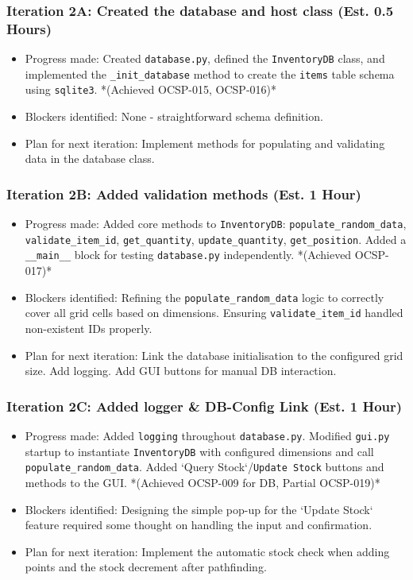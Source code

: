 \subsubsection{Iteration 2A: Created the database and host class (Est. 0.5 Hours)}
\begin{itemize}
	\item Progress made: Created \verb|database.py|, defined the \verb|InventoryDB| class, and implemented the \verb|_init_database| method to create the \verb|items| table schema using \verb|sqlite3|. *(Achieved OCSP-015, OCSP-016)*
	\item Blockers identified: None - straightforward schema definition.
	\item Plan for next iteration: Implement methods for populating and validating data in the database class.
\end{itemize}

\subsubsection{Iteration 2B: Added validation methods (Est. 1 Hour)}
\begin{itemize}
	\item Progress made: Added core methods to \verb|InventoryDB|: \verb|populate_random_data|, \verb|validate_item_id|, \verb|get_quantity|, \verb|update_quantity|, \verb|get_position|. Added a \verb|__main__| block for testing \verb|database.py| independently. *(Achieved OCSP-017)*
	\item Blockers identified: Refining the \verb|populate_random_data| logic to correctly cover all grid cells based on dimensions. Ensuring \verb|validate_item_id| handled non-existent IDs properly.
	\item Plan for next iteration: Link the database initialisation to the configured grid size. Add logging. Add GUI buttons for manual DB interaction.
\end{itemize}

\subsubsection{Iteration 2C: Added logger \& DB-Config Link (Est. 1 Hour)}
\begin{itemize}
	\item Progress made: Added \verb|logging| throughout \verb|database.py|. Modified \verb|gui.py| startup to instantiate \verb|InventoryDB| with configured dimensions and call \verb|populate_random_data|. Added `Query Stock`/\verb|Update Stock| buttons and methods to the GUI. *(Achieved OCSP-009 for DB, Partial OCSP-019)*
	\item Blockers identified: Designing the simple pop-up for the `Update Stock` feature required some thought on handling the input and confirmation.
	\item Plan for next iteration: Implement the automatic stock check when adding points and the stock decrement after pathfinding.
\end{itemize}

